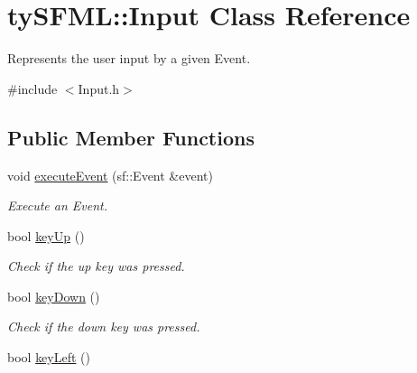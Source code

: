 \hypertarget{classty_s_f_m_l_1_1_input}{}\section{ty\+S\+F\+M\+L\+:\+:Input Class Reference}
\label{classty_s_f_m_l_1_1_input}


Represents the user input by a given Event.  




{\ttfamily \#include $<$Input.\+h$>$}

\subsection*{Public Member Functions}
\begin{DoxyCompactItemize}
\item 
\hypertarget{classty_s_f_m_l_1_1_input_ad8acb2d2da890b1613f4d84869158890}{}void \hyperlink{classty_s_f_m_l_1_1_input_ad8acb2d2da890b1613f4d84869158890}{execute\+Event} (sf\+::\+Event \&event)\label{classty_s_f_m_l_1_1_input_ad8acb2d2da890b1613f4d84869158890}

\begin{DoxyCompactList}\small\item\em Execute an Event. \end{DoxyCompactList}\item 
\hypertarget{classty_s_f_m_l_1_1_input_afb743ddd1dd629f45e1445a0ef6bf668}{}bool \hyperlink{classty_s_f_m_l_1_1_input_afb743ddd1dd629f45e1445a0ef6bf668}{key\+Up} ()\label{classty_s_f_m_l_1_1_input_afb743ddd1dd629f45e1445a0ef6bf668}

\begin{DoxyCompactList}\small\item\em Check if the up key was pressed. \end{DoxyCompactList}\item 
\hypertarget{classty_s_f_m_l_1_1_input_a90a39e91e5144c0a0e12e28a17d7f60d}{}bool \hyperlink{classty_s_f_m_l_1_1_input_a90a39e91e5144c0a0e12e28a17d7f60d}{key\+Down} ()\label{classty_s_f_m_l_1_1_input_a90a39e91e5144c0a0e12e28a17d7f60d}

\begin{DoxyCompactList}\small\item\em Check if the down key was pressed. \end{DoxyCompactList}\item 
\hypertarget{classty_s_f_m_l_1_1_input_a322810506ed109c1a918e3c3ddd5cde3}{}bool \hyperlink{classty_s_f_m_l_1_1_input_a322810506ed109c1a918e3c3ddd5cde3}{key\+Left} ()\label{classty_s_f_m_l_1_1_input_a322810506ed109c1a918e3c3ddd5cde3}


\end{DoxyCompactItemize}
